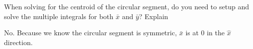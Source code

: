 When solving for the centroid of the circular segment, do you need to setup and solve the
multiple integrals for both $\bar{x}$ and $\bar{y}$? Explain

\begin{solution}
    No. Because we know the circular segment is symmetric, $\bar{x}$ is at 0 in the $\hat{x}$ direction.
\end{solution}